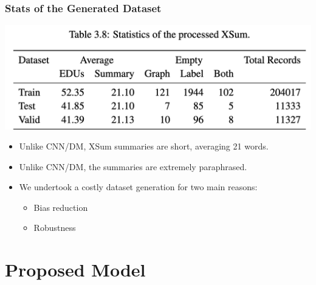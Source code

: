 \documentclass{beamer}
\begin{document}
\begin{frame}
\frametitle{Stats of the Generated Dataset}

\begin{center}
\includegraphics[scale=.4]{imgs/stats_of_generated_xsum.png}
\end{center}
  \begin{minipage}[t][0.3\textheight][t]{\textwidth}
    \begin{itemize}
      \item Unlike CNN/DM, XSum summaries are short, averaging 21 words.
      \item Unlike CNN/DM, the summaries are extremely paraphrased.
      \item We undertook a costly dataset generation for two main reasons:
      \begin{itemize}
          \item Bias reduction 
          \item Robustness
      \end{itemize}
    \end{itemize}
  \end{minipage}

\end{frame}


\section{Proposed Model}




\end{document}
